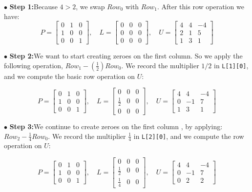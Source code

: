 $\bullet$ {\bf Step 1:}\quad Because $4>2$, we swap $Row_0$ with 
$Row_1$. After this row operation we have:
$$
P=
\begin{bmatrix}
0 & 1 & 0 \\
1 & 0 & 0 \\
0 & 0 & 1  
\end{bmatrix}
, \quad 
L =
\begin{bmatrix}
0 & 0 & 0 \\
0 & 0 & 0 \\
0 & 0 & 0  
\end{bmatrix}
, \quad
U =
\begin{bmatrix}
4 & 4 & -4 \\
2 & 1 & 5 \\
1 & 3 & 1  
\end{bmatrix}
$$

$\bullet$ {\bf Step 2:}\quad We want to start creating zeroes on the first column. So we apply the following operation, $Row_1 - (\frac{1}{2})Row_0$. We record the multiplier $1/2$ in {\tt L[1][0]}, and we compute the basic row operation on $U$:

$$
P=
\begin{bmatrix}
0 & 1 & 0 \\
1 & 0 & 0 \\
0 & 0 & 1  
\end{bmatrix}
, \quad
L =
\begin{bmatrix}
0 & 0 & 0 \\
\frac{1}{2} & 0 & 0 \\
0 & 0 & 0  
\end{bmatrix}
, \quad
U =
\begin{bmatrix}
4 & 4 & -4 \\
0 & -1 & 7 \\
1 & 3 & 1  
\end{bmatrix}
$$

$\bullet$ {\bf Step 3:}\quad We continue to create zeroes on the first column , by applying: $Row_2 - \frac{1}{4} Row_0$. We record the multiplier $\frac{1}{4}$ in {\tt L[2][0]}, and we compute the row operation on $U$:

$$
P=
\begin{bmatrix}
0 & 1 & 0 \\
1 & 0 & 0 \\
0 & 0 & 1  
\end{bmatrix}
, \quad
L =
\begin{bmatrix}
0 & 0 & 0 \\
\frac{1}{2} & 0 & 0 \\
\frac{1}{4} & 0 & 0  
\end{bmatrix}
, \quad
U =
\begin{bmatrix}
4 & 4 & -4 \\
0 & -1 & 7 \\
0 & 2 & 2  
\end{bmatrix}
$$

